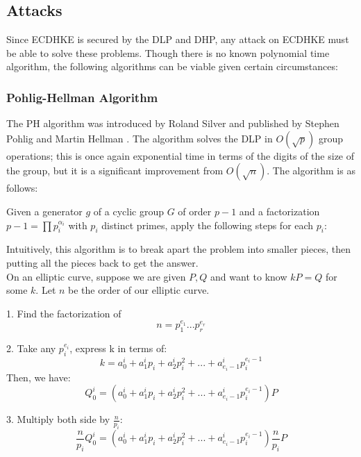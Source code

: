 \documentclass{article}
\theoremstyle{plain}
\theoremstyle{definition}
\begin{document}
        \subsection{Attacks}\label{attacks}
                
                Since ECDHKE is secured by the DLP and DHP, any attack on ECDHKE must be able to solve these problems.
                Though there is no known polynomial time algorithm, the following algorithms can be viable given certain circumstances:

                
                \subsubsection{Pohlig-Hellman Algorithm}\label{SPHA}
                        The PH algorithm was introduced by Roland Silver and published by Stephen Pohlig and Martin Hellman \cite{1055817}.
                        The algorithm solves the DLP in $O(\sqrt{p})$ group operations; this is once again exponential time in terms of the digits of the size of the group, but it is a significant improvement from $O(\sqrt{n})$.
                        The algorithm is as follows:

                        Given a generator $g$ of a cyclic group $G$ of order $p - 1$ and a factorization $p - 1 = \prod p_i^{\alpha_i}$ with $p_i$ distinct primes, apply the following steps for each $p_i$:
                       
                        Intuitively, this algorithm is to break apart the problem into smaller pieces, then putting all the pieces back to get the answer.\\
On an elliptic curve, suppose we are given $P, Q$ and want to know $kP = Q$ for some $k$. Let $n$ be the order of our elliptic curve.

\hspace{2em} 1. Find the factorization of \[n=p^{e_1}_1...p^{e_r}_r\]


\hspace{2em} 2. Take any $p^{e_i}_i$, express k in terms of:
\[k = a^i_0 +a^i_1p_i + a^i_2p_i^2+...+a^i_{e_i -1}p_i^{e_i -1}\]
\hspace{4em}Then, we have:
\[Q_0^{i} = (a^i_0 +a^i_1p_i + a^i_2p_i^2+...+a^i_{e_i -1}p_i^{e_i -1})P\]


\hspace{2em} 3. Multiply both side by $\frac{n}{p_i}:$
\[\frac{n}{p_i}Q_0^{i} = (a^i_0 +a^i_1p_i + a^i_2p_i^2+...+a^i_{e_i -1}p_i^{e_i -1})\frac{n}{p_i} P\]
\end{document}
